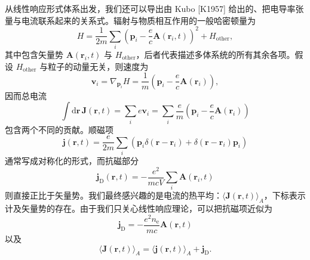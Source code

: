 从线性响应形式体系出发，我们还可以导出由 Kubo [K1957] 给出的、把电导率张量与电流联系起来的关系式。辐射与物质相互作用的一般哈密顿量为
\begin{equation*}
H=\frac{1}{2m}\sum_{i}\left(\mathbf{p}_{i}-\frac{e}{c}\mathbf{A}(\mathbf{r}_{i},t)\right)^{2}+H_{\mathrm{other}},
\tag{9.126}
\end{equation*}
其中包含矢量势 $\mathbf{A}(\mathbf{r}_{i},t)$ 与 $H_{\mathrm{other}}$，后者代表描述多体系统的所有其余各项。假设 $H_{\mathrm{other}}$ 与粒子的动量无关，则速度为
\begin{equation*}
\mathbf{v}_{i}=\nabla_{\mathbf{p}_{i}}H=\frac{1}{m}\left(\mathbf{p}_{i}-\frac{e}{c}\mathbf{A}(\mathbf{r}_{i})\right),
\tag{9.127}
\end{equation*}
因而总电流
\begin{equation*}
\int\mathrm{d}\mathbf{r}\,\mathbf{J}(\mathbf{r},t)=\sum_{i}e\mathbf{v}_{i}=\sum_{i}\frac{e}{m}\left(\mathbf{p}_{i}-\frac{e}{c}\mathbf{A}(\mathbf{r}_{i})\right)
\tag{9.128}
\end{equation*}
包含两个不同的贡献。顺磁项
\begin{equation*}
\mathbf{j}(\mathbf{r},t)=\frac{e}{2m}\sum_{i}\left(\mathbf{p}_{i}\delta(\mathbf{r}-\mathbf{r}_{i})+\delta(\mathbf{r}-\mathbf{r}_{i})\mathbf{p}_{i}\right)
\tag{9.129}
\end{equation*}
通常写成对称化的形式，而抗磁部分
\begin{equation*}
\mathbf{j}_{\mathrm{D}}(\mathbf{r},t)=-\frac{e^{2}}{mcV}\sum_{i}\mathbf{A}(\mathbf{r}_{i},t)
\tag{9.130}
\end{equation*}
则直接正比于矢量势。我们最终感兴趣的是电流的热平均：$\langle\mathbf{J}(\mathbf{r},t)\rangle_{A}$，下标表示计及矢量势的存在。由于我们只关心线性响应理论，可以把抗磁项近似为
\begin{equation*}
\mathbf{j}_{\mathrm{D}}=-\frac{e^{2}n_{\mathrm{e}}}{mc}\mathbf{A}(\mathbf{r},t)
\tag{9.131}
\end{equation*}
以及
\begin{equation*}
\langle\mathbf{J}(\mathbf{r},t)\rangle_{A}=\langle\mathbf{j}(\mathbf{r},t)\rangle_{A}+\mathbf{j}_{\mathrm{D}}.
\tag{9.132}
\end{equation*}

